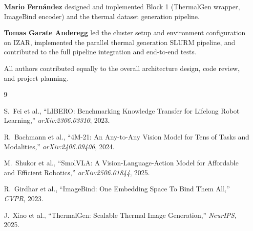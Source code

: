 \documentclass[10pt,conference,compsocconf]{IEEEtran}
\begin{document}
\textbf{Mario Fern\'andez} designed and implemented Block 1 (ThermalGen wrapper, ImageBind encoder) and the thermal dataset generation pipeline.

\textbf{Tomas Garate Anderegg} led the cluster setup and environment configuration on IZAR, implemented the parallel thermal generation SLURM pipeline, and contributed to the full pipeline integration and end-to-end tests.

All authors contributed equally to the overall architecture design, code review, and project planning.



\begin{thebibliography}{9}

S.\ Fei et al., ``LIBERO: Benchmarking Knowledge Transfer for Lifelong Robot Learning,'' \textit{arXiv:2306.03310}, 2023.

R.\ Bachmann et al., ``4M-21: An Any-to-Any Vision Model for Tens of Tasks and Modalities,'' \textit{arXiv:2406.09406}, 2024.

M.\ Shukor et al., ``SmolVLA: A Vision-Language-Action Model for Affordable and Efficient Robotics,'' \textit{arXiv:2506.01844}, 2025.

R.\ Girdhar et al., ``ImageBind: One Embedding Space To Bind Them All,'' \textit{CVPR}, 2023.

J.\ Xiao et al., ``ThermalGen: Scalable Thermal Image Generation,'' \textit{NeurIPS}, 2025.

\end{thebibliography}
\end{document}
